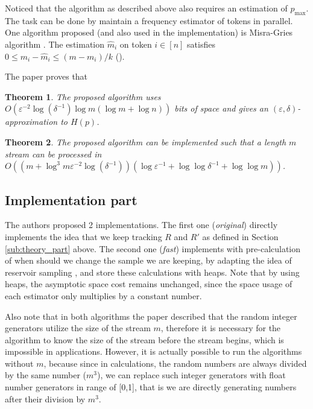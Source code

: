\documentclass{scrartcl}
\newtheorem{theorem}{Theorem}
\begin{document}
Noticed that the algorithm as described above also requires an estimation of $p_{\max}$. The task can be done by maintain a frequency estimator of tokens in parallel. One algorithm proposed (and also used in the implementation) is Misra-Gries algorithm \citep{Misra:1982:FRE:867576}. The estimation $\hat{m}_i$ on token $i\in[n]$ satisfies $0\leq m_i-\hat{m}_i\leq(m-m_i)/k$ (\citep{Bose2003BoundsFF}).

The paper \citep{chakrabarti2010near} proves that

\begin{theorem}
The proposed algorithm uses $O(\varepsilon^{-2}\log{(\delta^{-1})\log{m(\log{m}+\log{n})}})$ bits of space and gives an $(\varepsilon, \delta)$-approximation to $H(p)$.
\end{theorem}
\begin{theorem}
The proposed algorithm can be implemented such that a length $m$ stream can be processed in $O((m+\log^3{m}\varepsilon^{-2}\log{(\delta^{-1})})(\log{\varepsilon^{-1}+\log\log{\delta^{-1}}+\log\log{m}}))$.
\label{thm2}
\end{theorem}

\subsection{Implementation part} %
\label{sub:implementation_part}

The authors proposed 2 implementations. The first one (\emph{original}) directly implements the idea that we keep tracking $R$ and $R'$ as defined in Section \ref{sub:theory_part} above. The second one (\emph{fast}) implements with pre-calculation of when should we change the sample we are keeping, by adapting the idea of reservoir sampling \citep{Vitter:1985:RSR:3147.3165}, and store these calculations with heaps. Note that by using heaps, the asymptotic space cost remains unchanged, since the space usage of each estimator only multiplies by a constant number.

Also note that in both algorithms the paper described that the random integer generators utilize the size of the stream $m$, therefore it is necessary for the algorithm to know the size of the stream before the stream begins, which is impossible in applications. However, it is actually possible to run the algorithms without $m$, because since in calculations, the random numbers are always divided by the same number ($m^3$), we can replace such integer generators with float number generators in range of [0,1], that is we are directly generating numbers after their division by $m^3$.
\end{document}
